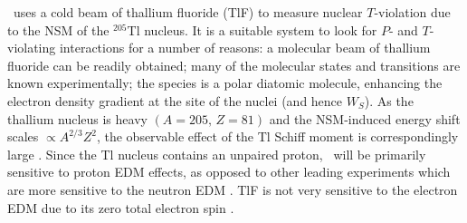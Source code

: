 \CENTREX\ uses a cold beam of thallium fluoride (TlF) to measure nuclear $T$-violation due to the NSM of the $^{205}$Tl nucleus. It is a suitable system to look for $P$- and $T$-violating interactions for a number of reasons: a molecular beam of thallium fluoride can be readily obtained; many of the molecular states and transitions are known experimentally; the species is a polar diatomic molecule, enhancing the electron density gradient at the site of the nuclei (and hence $W_S$). As the thallium nucleus is heavy $\left(A=205,\,Z=81\right)$ and the NSM-induced energy shift scales $\propto A^{2/3}Z^2$, the observable effect of the Tl Schiff moment is correspondingly large \cite{sandars1967measurability, wilkening1984search}. Since the Tl nucleus contains an unpaired proton,
\CENTREX\ will be primarily sensitive to proton EDM effects, as opposed to other leading experiments which are more sensitive to the
neutron EDM \cite{graner2016reduced}. TlF is not very sensitive to the electron EDM due to its zero total electron spin \cite{kozlov1995parity}. 

